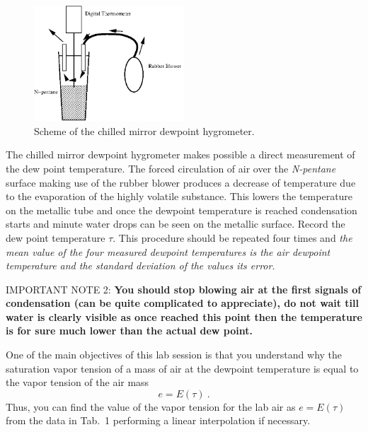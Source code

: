\documentclass{article}
\begin{document}
\begin{figure}[h]
\begin{center}
\includegraphics[width=0.5\textwidth]{Figs/hygro.png} %
\caption{Scheme of the chilled mirror
dewpoint hygrometer.}\label{fig_mirrordew}
\end{center}
\end{figure}


The chilled mirror dewpoint hygrometer makes possible a direct
measurement of the dew point temperature. The forced circulation of
air over the \textit{N-pentane} surface making use of the rubber
blower produces a decrease of temperature due to the evaporation of
the highly volatile substance. This lowers the temperature on the
metallic tube and once the dewpoint temperature is reached
condensation starts and minute water drops can be seen on the
metallic surface. Record the dew point temperature $\tau$. This
procedure should be repeated four times and \textit{the mean value
of the four measured dewpoint temperatures is the air dewpoint temperature and the standard deviation of the values its error}. 

\vspace{0.2cm}
IMPORTANT NOTE 2:  \textbf{You should stop blowing air at the first signals
  of condensation (can be quite complicated to appreciate), do not
  wait till water is clearly visible as once reached this point then
  the temperature is for sure much lower than the actual dew point.}

\vspace{0.2cm}
One of the main objectives of this lab session is that you understand
why the saturation vapor tension of a mass of air at the dewpoint
temperature is equal to the vapor tension of the air mass
\begin{equation}
e = E(\tau)~.
\end{equation}
Thus, you can find the value of the vapor tension for the lab air as $e = E(\tau)$
from the data in Tab.\ 1 performing a linear interpolation
if necessary.
\end{document}
